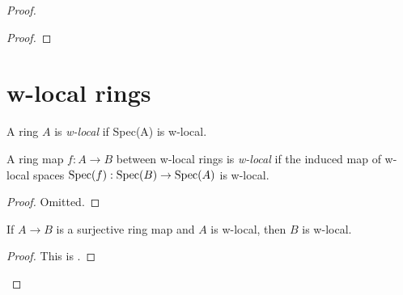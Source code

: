 \begin{proof}
\begin{proof}
\end{proof}

\section{w-local rings}

\begin{definition}
    A ring \(A\) is \emph{w-local} if Spec(A) is w-local.
    \label{def:w-local-ring}
    \leanok
\end{definition}

\begin{definition}
    A ring map \(f: A \to B\) between w-local rings is \emph{w-local} if the induced map of w-local spaces \(\operatorname{Spec}(f) : \operatorname{Spec}(B) \to \operatorname{Spec}(A)\) is w-local.
    \label{def:w-local-ring-map}
\end{definition}

\begin{proof}
  Omitted.
\end{proof}

\begin{lemma}
  \label{thm:surjective-w-local-ring}
  If \(A \to B\) is a surjective ring map and \(A\) is w-local, then \(B\) is w-local.
\end{lemma}

\begin{proof}
  This is .
\end{proof}


\end{proof}
